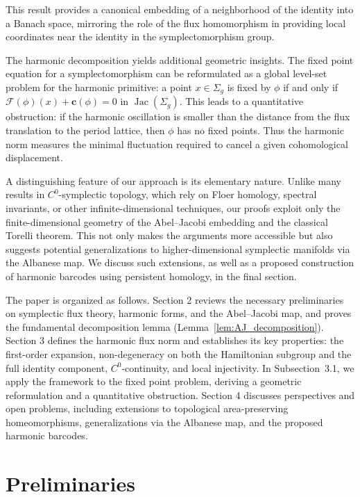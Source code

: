 \documentclass[11pt]{article}
\theoremstyle{definition}
\begin{document}
	This result provides a canonical embedding of a neighborhood of the identity into a Banach space, mirroring the role of the flux homomorphism in providing local coordinates near the identity in the symplectomorphism group.
	
	\medskip\noindent
	The harmonic decomposition yields additional geometric insights. The fixed point equation for a symplectomorphism can be reformulated as a global level-set problem for the harmonic primitive: a point $x\in\Sigma_g$ is fixed by $\phi$ if and only if $\mathcal F(\phi)(x)+\mathbf c(\phi)=0$ in $\operatorname{Jac}(\Sigma_g)$. This leads to a quantitative obstruction: if the harmonic oscillation is smaller than the distance from the flux translation to the period lattice, then $\phi$ has no fixed points. Thus the harmonic norm measures the minimal fluctuation required to cancel a given cohomological displacement.
	
	\medskip\noindent
	A distinguishing feature of our approach is its elementary nature. Unlike many results in $C^0$-symplectic topology, which rely on Floer homology, spectral invariants, or other infinite-dimensional techniques, our proofs exploit only the finite-dimensional geometry of the Abel--Jacobi embedding and the classical Torelli theorem. This not only makes the arguments more accessible but also suggests potential generalizations to higher-dimensional symplectic manifolds via the Albanese map. We discuss such extensions, as well as a proposed construction of harmonic barcodes using persistent homology, in the final section.
	
	\medskip\noindent
	The paper is organized as follows. Section 2 reviews the necessary preliminaries on symplectic flux theory, harmonic forms, and the Abel--Jacobi map, and proves the fundamental decomposition lemma (Lemma~\ref{lem:AJ_decomposition}). Section 3 defines the harmonic flux norm and establishes its key properties: the first-order expansion, non-degeneracy on both the Hamiltonian subgroup and the full identity component, $C^0$-continuity, and local injectivity. In Subsection~3.1, we apply the framework to the fixed point problem, deriving a geometric reformulation and a quantitative obstruction. Section 4 discusses perspectives and open problems, including extensions to topological area-preserving homeomorphisms, generalizations via the Albanese map, and the proposed harmonic barcodes.
	
	
	
	\section{Preliminaries}
	
\end{document}
